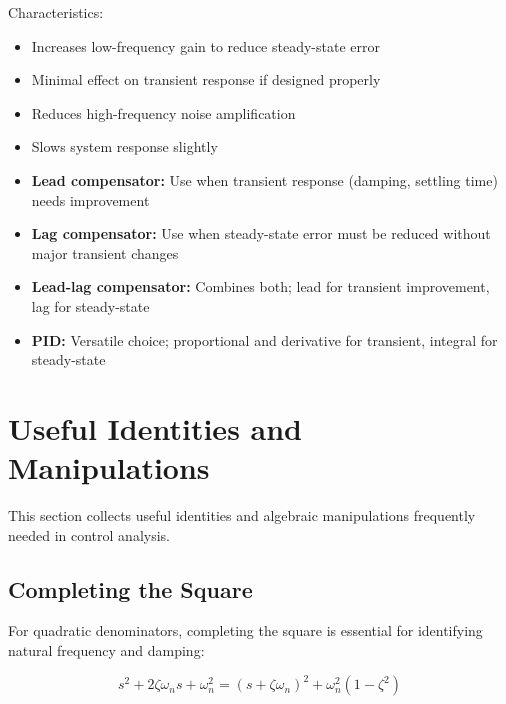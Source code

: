 Characteristics:
\begin{itemize}
    \item Increases low-frequency gain to reduce steady-state error
    \item Minimal effect on transient response if designed properly
    \item Reduces high-frequency noise amplification
    \item Slows system response slightly
\end{itemize}

\begin{practicalbox}[title=Compensator Design Guidelines]
\begin{itemize}
    \item \textbf{Lead compensator:} Use when transient response (damping, settling time) needs improvement
    \item \textbf{Lag compensator:} Use when steady-state error must be reduced without major transient changes
    \item \textbf{Lead-lag compensator:} Combines both; lead for transient improvement, lag for steady-state
    \item \textbf{PID:} Versatile choice; proportional and derivative for transient, integral for steady-state
\end{itemize}
\end{practicalbox}

\section{Useful Identities and Manipulations}
\label{sec:identities}

This section collects useful identities and algebraic manipulations frequently needed in control analysis.

\subsection{Completing the Square}
\label{subsec:completing_square}

For quadratic denominators, completing the square is essential for identifying natural frequency and damping:

\begin{equation}
    s^2 + 2\zeta\omega_n s + \omega_n^2 = (s + \zeta\omega_n)^2 + \omega_n^2(1 - \zeta^2)
\end{equation}

